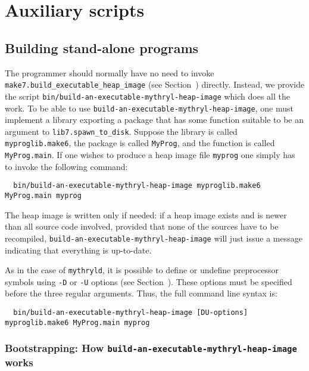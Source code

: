 
\section{Auxiliary scripts}

\subsection{Building stand-alone programs}
\label{sec:build-an-executabe-heap-image}

The programmer should normally have no need to invoke {\tt
make7.build_executable_heap_image} (see Section~) directly.
Instead, we provide the script {\tt bin/build-an-executable-mythryl-heap-image} which does all the
work.  To be able to use {\tt build-an-executable-mythryl-heap-image}, one must implement a library
exporting a package that has some function suitable to be an
argument to {\tt lib7.spawn_to_disk}.  Suppose the library is called
{\tt myproglib.make6}, the package is called {\tt MyProg}, and the
function is called {\tt MyProg.main}.  If one wishes to produce a heap
image file {\tt myprog} one simply has to invoke the following
command:

\begin{verbatim}
  bin/build-an-executable-mythryl-heap-image myproglib.make6 MyProg.main myprog
\end{verbatim}

The heap image is written only if needed: if a heap image exists and
is newer than all source code involved, provided that none of the
sources have to be recompiled, {\tt build-an-executable-mythryl-heap-image}
will just issue a message indicating that everything is up-to-date.

As in the case of {\tt mythryld}, it is possible to define or undefine
preprocessor symbols using {\tt -D} or {\tt -U} options (see
Section~).  These options must be specified
before the three regular arguments.  Thus, the full command line
syntax is:

\begin{verbatim}
  bin/build-an-executable-mythryl-heap-image [DU-options] myproglib.make6 MyProg.main myprog
\end{verbatim}

\subsubsection{Bootstrapping: How {\tt build-an-executable-mythryl-heap-image} works}

